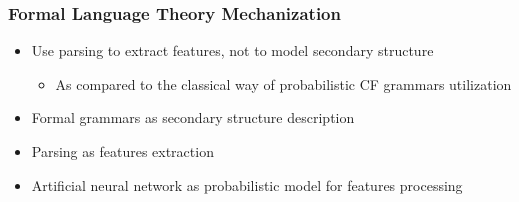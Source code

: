\documentclass[xcolor=table]{beamer}
\begin{document}
\begin{frame} \frametitle{Formal Language Theory Mechanization}

\begin{itemize}
  \item Use parsing to extract features, not to model secondary structure
  \begin{itemize}
    \item As compared to the classical way of probabilistic CF grammars utilization
  \end{itemize}
  \pause
  \item Formal grammars as secondary structure description
  \item Parsing as features extraction
  \item Artificial neural network as probabilistic model for features processing
\end{itemize}

\end{frame}
\end{document}
